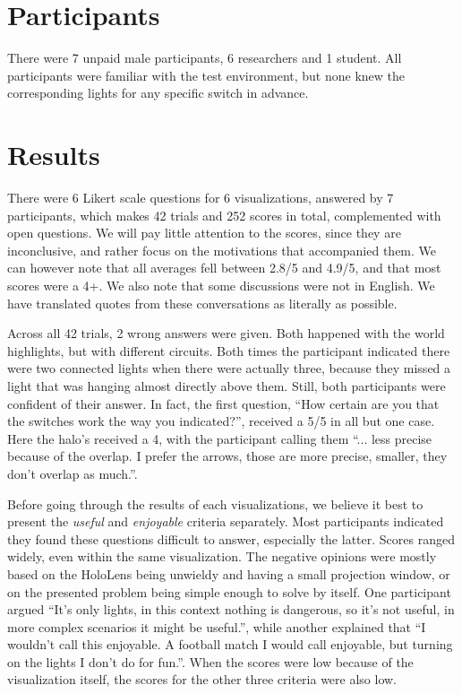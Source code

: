 \section{Participants} \label{sec:user:survey:participants}
There were 7 unpaid male participants, 6 researchers and 1 student. All participants were familiar with the test environment, but none knew the corresponding lights for any specific switch in advance.

\section{Results} \label{sec:user:results}
There were 6 Likert scale questions for 6 visualizations, answered by 7 participants, which makes 42 trials and 252 scores in total, complemented with open questions. We will pay little attention to the scores, since they are inconclusive, and rather focus on the motivations that accompanied them. We can however note that all averages fell between 2.8/5 and 4.9/5, and that most scores were a 4+. We also note that some discussions were not in English. We have translated quotes from these conversations as literally as possible.

Across all 42 trials, 2 wrong answers were given. Both happened with the world highlights, but with different circuits. Both times the participant indicated there were two connected lights when there were actually three, because they missed a light that was hanging almost directly above them. Still, both participants were confident of their answer. In fact, the first question, ``How certain are you that the switches work the way you indicated?'', received a 5/5 in all but one case. Here the halo's received a 4, with the participant calling them ``... less precise because of the overlap. I prefer the arrows, those are more precise, smaller, they don't overlap as much.''.

Before going through the results of each visualizations, we believe it best to present the \textit{useful} and \textit{enjoyable} criteria separately. Most participants indicated they found these questions difficult to answer, especially the latter. Scores ranged widely, even within the same visualization. The negative opinions were mostly based on the HoloLens being unwieldy and having a small projection window, or on the presented problem being simple enough to solve by itself. One participant argued ``It's only lights, in this context nothing is dangerous, so it's not useful, in more complex scenarios it might be useful.'', while another explained that ``I wouldn't call this enjoyable. A football match I would call enjoyable, but turning on the lights I don't do for fun.''. When the scores were low because of the visualization itself, the scores for the other three criteria were also low.

